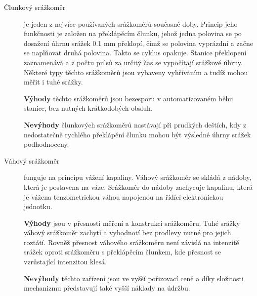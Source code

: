 \documentclass[a4paper,12pt]{article}
\begin{document}
\begin{description} 
\item[Člunkový srážkoměr] je jeden z nejvíce používaných srážkoměrů současné doby. Princip jeho funkčnosti je založen na překlápěcím člunku, jehož jedna polovina se po dosažení úhrnu srážek 0.1 mm překlopí, čímž se polovina vyprázdní a začne se naplňovat druhá polovina. Takto se cyklus opakuje. Stanice překlopení zaznamenává a z počtu pulsů za určitý čas se vypočítají srážkové úhrny. Některé typy těchto srážkoměrů jsou vybaveny vyhříváním a tudíž mohou měřit i tuhé srážky.

\textbf{Výhody} těchto srážkoměrů jsou bezesporu v automatizovaném běhu stanice, bez nutných krátkodobých obsluh. 

\textbf{Nevýhody} člunkových srážkoměrů nastávají při prudkých deštích, kdy z nedostatečně rychlého překlápění člunku mohou být výsledné úhrny srážek podhodnoceny.\cite{sevruk}
\end{description}

\begin{description} 
\item[Váhový srážkoměr] funguje na principu vážení kapaliny. Váhový srážkoměr se skládá z nádoby, která je postavena na váze. Srážkoměr do nádoby zachycuje kapalinu, která je vážena tenzometrickou váhou napojenou na řídící elektronickou jednotku.

\textbf{Výhody} jsou v přesnosti měření a konstrukci srážkoměru. Tuhé srážky váhový srážkoměr zachytí a vyhodnotí bez prodlevy nutné pro jejich roztátí. Rovněž přesnost váhového srážkoměru není závislá na intenzitě srážek oproti srážkoměru s překlápěcím člunkem, kde přesnost se vzrůstající intenzitou klesá.

\textbf{Nevýhody} těchto zařízení jsou ve vyšší pořizovací ceně a díky složitosti mechanizmu představují také vyšší náklady na údržbu.
\end{description}
\end{document}
